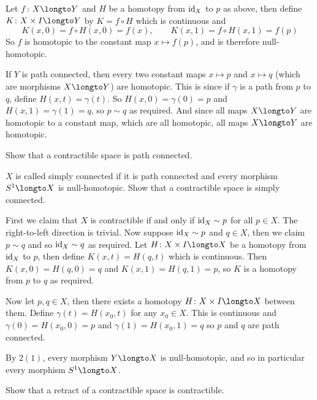     \item Let $f\colon X\longto Y$ and $H$ be a homotopy from ${\rm id}_X$ to $p$ as above, then define $K\colon X\times I\longto Y$ by $K=f\circ H$ which is continuous and
    $$ K(x,0) = f\circ H(x,0) = f(x),\qquad K(x,1) = f\circ H(x,1) = f(p) $$
    So $f$ is homotopic to the constant map $x\mapsto f(p)$, and is therefore null-homotopic.

    If $Y$ is path connected, then every two constant maps $x\mapsto p$ and $x\mapsto q$ (which are morphisms $X\longto Y$) are homotopic.
    This is since if $\gamma$ is a path from $p$ to $q$, define $H(x,t)=\gamma(t)$.
    So $H(x,0)=\gamma(0)=p$ and $H(x,1)=\gamma(1)=q$, so $p\sim q$ as required.
    And since all maps $X\longto Y$ are homotopic to a constant map, which are all homotopic, all maps $X\longto Y$ are homotopic.
\eenum

\bexerc

    \benum
        \item Show that a contractible space is path connected.
        \item $X$ is called {\emphcolor simply connected} if it is path connected and every morphism $S^1\longto X$ is null-homotopic.
        Show that a contractible space is simply connected.
    \eenum

\eexerc

\benum
    \item First we claim that $X$ is contractible if and only if ${\rm id}_X\sim p$ for all $p\in X$.
    The right-to-left direction is trivial.
    Now suppose ${\rm id}_X\sim p$ and $q\in X$, then we claim $p\sim q$ and so ${\rm id}_X\sim q$ as required.
    Let $H\colon X\times I\longto X$ be a homotopy from ${\rm id}_X$ to $p$, then define $K(x,t)=H(q,t)$ which is continuous.
    Then $K(x,0)=H(q,0)=q$ and $K(x,1)=H(q,1)=p$, so $K$ is a homotopy from $p$ to $q$ as required.

    Now let $p,q\in X$, then there exists a homotopy $H\colon X\times I\longto X$ between them.
    Define $\gamma(t)=H(x_0,t)$ for any $x_0\in X$.
    This is continuous and $\gamma(0)=H(x_0,0)=p$ and $\gamma(1)=H(x_0,1)=q$ so $p$ and $q$ are path connected.

    \item By $2(1)$, every morphism $Y\longto X$ is null-homotopic, and so in particular every morphism $S^1\longto X$.
\eenum

\bexerc

    Show that a retract of a contractible space is contractible.

